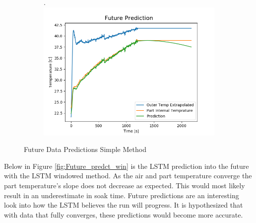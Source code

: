\begin{figure}[ht]
\begin{subfigure}{.34\linewidth}
    \end{subfigure}
    \begin{subfigure}{.33\linewidth}.
        \centering
    	\includegraphics[width=\linewidth]{lstm/future_predict3.png}
    \end{subfigure}
    \caption{Future Data Predictions Simple Method}
    \label{fig:Future_predct_simple}
\end{figure}
\newline
Below in Figure \ref{fig:Future_predct_win} is the LSTM prediction into the future with the LSTM windowed method. As the air and part temperature converge the part temperature's slope does not decrease as expected. This would most likely result in an underestimate in soak time. Future predictions are an interesting look into how the LSTM believes the run will progress. It is hypothesized that with data that fully converges, these predictions would become more accurate. 
